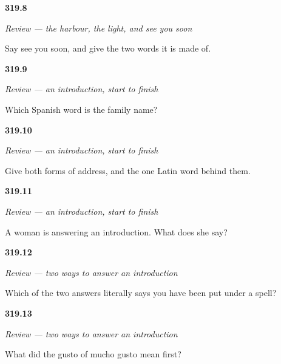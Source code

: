 \noindent\begin{minipage}[t]{\linewidth}
\raggedright
\hypertarget{review-ES-C319-despedida-soon}{\textbf{319.8}} \emph{Review — the harbour, the light, and see you soon}\par
\small Say see you soon, and give the two words it is made of.
\end{minipage}\par\medskip

\noindent\begin{minipage}[t]{\linewidth}
\raggedright
\hypertarget{review-ES-C319-repaso-presentarse-surname}{\textbf{319.9}} \emph{Review — an introduction, start to finish}\par
\small Which Spanish word is the family name?
\end{minipage}\par\medskip

\noindent\begin{minipage}[t]{\linewidth}
\raggedright
\hypertarget{review-ES-C319-repaso-presentarse-address}{\textbf{319.10}} \emph{Review — an introduction, start to finish}\par
\small Give both forms of address, and the one Latin word behind them.
\end{minipage}\par\medskip

\noindent\begin{minipage}[t]{\linewidth}
\raggedright
\hypertarget{review-ES-C319-repaso-presentarse-reply}{\textbf{319.11}} \emph{Review — an introduction, start to finish}\par
\small A woman is answering an introduction. What does she say?
\end{minipage}\par\medskip

\noindent\begin{minipage}[t]{\linewidth}
\raggedright
\hypertarget{review-ES-C319-dos-respuestas-spell}{\textbf{319.12}} \emph{Review — two ways to answer an introduction}\par
\small Which of the two answers literally says you have been put under a spell?
\end{minipage}\par\medskip

\noindent\begin{minipage}[t]{\linewidth}
\raggedright
\hypertarget{review-ES-C319-dos-respuestas-taste}{\textbf{319.13}} \emph{Review — two ways to answer an introduction}\par
\small What did the gusto of mucho gusto mean first?
\end{minipage}\par\medskip

